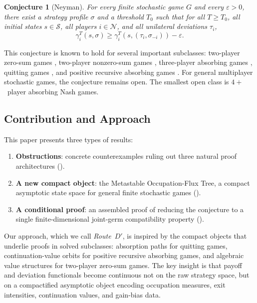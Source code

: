 \documentclass[12pt,a4paper]{article}
\newtheorem{conjecture}[theorem]{Conjecture}
\theoremstyle{definition}
\newcommand{\eps}{\varepsilon}
\newcommand{\cS}{\mathcal{S}}
\newcommand{\cN}{\mathcal{N}}
\begin{document}
\begin{conjecture}[Neyman]
\label{conj:neyman}
For every finite stochastic game $G$ and every $\eps > 0$, there exist a strategy profile $\sigma$ and a threshold $T_0$ such that for all $T \geq T_0$, all initial states $s \in \cS$, all players $i \in \cN$, and all unilateral deviations $\tau_i$,
\[
\gamma_i^T(s, \sigma) \geq \gamma_i^T(s, (\tau_i, \sigma_{-i})) - \eps.
\]
\end{conjecture}

This conjecture is known to hold for several important subclasses: two-player zero-sum games \cite{MertensNeyman1981, BewleyKohlberg1976}, two-player nonzero-sum games \cite{Vieille2000a, Vieille2000b}, three-player absorbing games \cite{Solan1999}, quitting games \cite{AshkenaziGolanetal2023}, and positive recursive absorbing games \cite{SolanVieille2025}. For general multiplayer stochastic games, the conjecture remains open. The smallest open class is $4+$~player absorbing Nash games.

\subsection{Contribution and Approach}

This paper presents three types of results:
\begin{enumerate}[label=(\roman*)]
\item \textbf{Obstructions}: concrete counterexamples ruling out three natural proof architectures ().
\item \textbf{A new compact object}: the Metastable Occupation-Flux Tree, a compact asymptotic state space for general finite stochastic games ().
\item \textbf{A conditional proof}: an assembled proof of  reducing the conjecture to a single finite-dimensional joint-germ compatibility property ().
\end{enumerate}

Our approach, which we call \emph{Route~$D'$}, is inspired by the compact objects that underlie proofs in solved subclasses: absorption paths for quitting games, continuation-value orbits for positive recursive absorbing games, and algebraic value structures for two-player zero-sum games. The key insight is that payoff and deviation functionals become continuous not on the raw strategy space, but on a compactified asymptotic object encoding occupation measures, exit intensities, continuation values, and gain-bias data.
\end{document}
